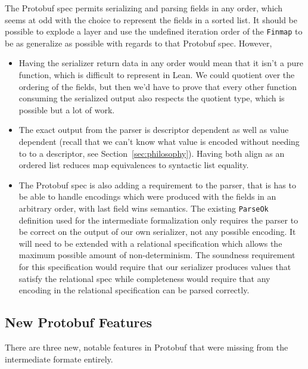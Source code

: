The Protobuf spec permits serializing and parsing fields in any order, which
seems at odd with the choice to represent the fields in a sorted list. It should
be possible to explode a layer and use the undefined iteration order of the
\texttt{Finmap} to be as generalize as possible with regards to that Protobuf
spec. However,

\begin{itemize}
\item Having the serializer return data in any order would mean that it isn't a
  pure function, which is difficult to represent in Lean. We could quotient over
  the ordering of the fields, but then we'd have to prove that every other
  function consuming the serialized output also respects the quotient type,
  which is possible but a lot of work.
\item The exact output from the parser is descriptor dependent as well as value
  dependent (recall that we can't know what value is encoded without needing to
  to a descriptor, see Section~\ref{sec:philosophy}). Having both align as an
  ordered list reduces map equivalences to syntactic list equality.
\item The Protobuf spec is also adding a requirement to the parser, that is has
  to be able to handle encodings which were produced with the fields in an
  arbitrary order, with last field wins semantics. The existing \texttt{ParseOk}
  definition used for the intermediate formalization only requires the parser to
  be correct on the output of our own serializer, not any possible encoding. It
  will need to be extended with a relational specification which allows the
  maximum possible amount of non-determinism. The soundness requirement for this
  specification would require that our serializer produces values that satisfy
  the relational spec while completeness would require that any encoding in the
  relational specification can be parsed correctly.
\end{itemize}

\subsection{New Protobuf Features}

There are three new, notable features in Protobuf that were missing from the
intermediate formate entirely.


